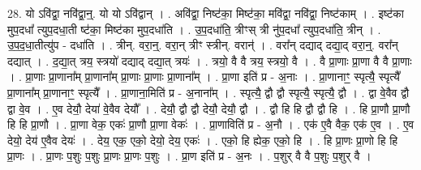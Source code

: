 \documentclass[17pt]{extarticle}
\begin{document}
28. यो ऽवि॑द्वा॒ नवि॑द्वा॒न्॒. यो यो ऽवि॑द्वान् । . अवि॑द्वा॒ निष्ट॑का॒ मिष्ट॑का॒ मवि॑द्वा॒ नवि॑द्वा॒ निष्ट॑काम् । . इष्ट॑का मुप॒दधा᳚ त्युप॒दधा॒ती ष्ट॑का॒ मिष्ट॑का मुप॒दधा॑ति । . उ॒प॒दधा॑ति॒ त्रीꣳस् त्री नु॑प॒दधा᳚ त्युप॒दधा॑ति॒ त्रीन् । . उ॒प॒द॒धा॒तीत्यु॑प - दधा॑ति । . त्रीन्. वरा॒न्॒. वरा॒न् त्रीꣳ स्त्रीन्. वरान्॑ । . वरा᳚न् दद्याद् दद्या॒द् वरा॒न्॒. वरा᳚न् दद्यात् । . द॒द्या॒त् त्रय॒ स्त्रयो॑ दद्याद् दद्या॒त् त्रयः॑ । . त्रयो॒ वै वै त्रय॒ स्त्रयो॒ वै । . वै प्रा॒णाः प्रा॒णा वै वै प्रा॒णाः । . प्रा॒णाः प्रा॒णाना᳚म् प्रा॒णाना᳚म् प्रा॒णाः प्रा॒णाः प्रा॒णाना᳚म् । . प्रा॒णा इति॑ प्र - अ॒नाः । . प्रा॒णानाꣳ॒॒ स्पृत्यै॒ स्पृत्यै᳚ प्रा॒णाना᳚म् प्रा॒णानाꣳ॒॒ स्पृत्यै᳚ । . प्रा॒णाना॒मिति॑ प्र - अ॒नाना᳚म् । . स्पृत्यै॒ द्वौ द्वौ स्पृत्यै॒ स्पृत्यै॒ द्वौ । . द्वा वे॒वैव द्वौ द्वा वे॒व । . ए॒व देयौ॒ देया॑ वे॒वैव देयौ᳚ । . देयौ॒ द्वौ द्वौ देयौ॒ देयौ॒ द्वौ । . द्वौ हि हि द्वौ द्वौ हि । . हि प्रा॒णौ प्रा॒णौ हि हि प्रा॒णौ । . प्रा॒णा वेक॒ एकः॑ प्रा॒णौ प्रा॒णा वेकः॑ । . प्रा॒णाविति॑ प्र - अ॒नौ । . एक॑ ए॒वै वैक॒ एक॑ ए॒व । . ए॒व देयो॒ देय॑ ए॒वैव देयः॑ । . देय॒ एक॒ एको॒ देयो॒ देय॒ एकः॑ । . एको॒ हि ह्येक॒ एको॒ हि । . हि प्रा॒णः प्रा॒णो हि हि प्रा॒णः । . प्रा॒णः प॒शुः प॒शुः प्रा॒णः प्रा॒णः प॒शुः । . प्रा॒ण इति॑ प्र - अ॒नः । . प॒शुर् वै वै प॒शुः प॒शुर् वै । \newline
\end{document}
